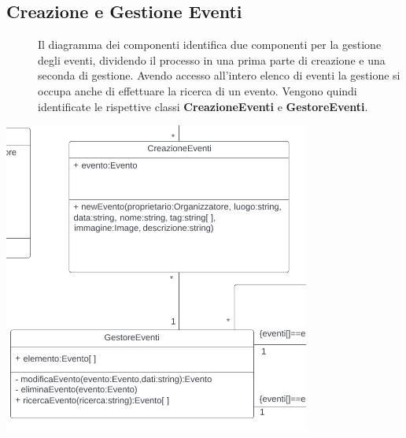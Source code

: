 \documentclass{article}
\begin{document}
\subsection{Creazione e Gestione Eventi}
\begin{description}
    \item[] Il diagramma dei componenti identifica due componenti per la gestione degli eventi, dividendo il processo in una prima parte di creazione e una seconda di gestione. Avendo accesso all'intero elenco di eventi la gestione si occupa anche di effettuare la ricerca di un evento. Vengono quindi identificate le rispettive classi \textbf{CreazioneEventi} e \textbf{GestoreEventi}.
\end{description}
\begin{center}
    \item[] \includegraphics[scale=0.7]{gestoreEventi.png}
\end{center}
\end{document}
